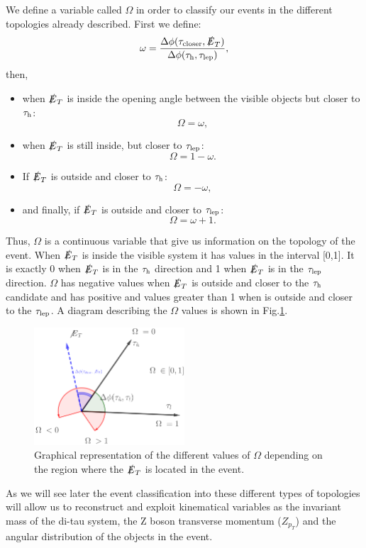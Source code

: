 We define a variable called $\Omega$ in order to classify our events in the different topologies already described. First we define:
\begin{equation}
	\omega=\frac{\Delta\phi(\tau_{\text{closer}},\slashed{E}_T)}{\Delta\phi(\tau_\text{h},\tau_\text{lep})},
\end{equation}
then,
\begin{itemize}
	\item when $\slashed{E}_T$ is inside the opening angle between the visible objects but closer to $\tau_\text{h}$:
	\begin{equation}
		\Omega=\omega,
	\end{equation}
	\item when $\slashed{E}_T$ is still inside, but closer to $\tau_\text{lep}$:
	\begin{equation}
		\Omega=1-\omega.
	\end{equation}
	\item If $\slashed{E}_T$ is outside and closer to $\tau_\text{h}$:
	\begin{equation}
		\Omega=-\omega,
	\end{equation}
	\item and finally, if $\slashed{E}_T$ is outside and closer to $\tau_\text{lep}$:
	\begin{equation}
		\Omega=\omega+1.
	\end{equation}
\end{itemize}
Thus, $\Omega$ is a continuous variable that give us information on the topology of the event. When $\slashed{E}_T$ is inside the visible system it has values in the interval [0,1]. It is exactly 0 when $\slashed{E}_T$ is in the $\tau_\text{h}$ direction and 1 when $\slashed{E}_T$ is in the $\tau_\text{lep}$ direction. $\Omega$ has negative values when $\slashed{E}_T$ is outside and closer to the $\tau_\text{h}$ candidate and has positive and values greater than 1 when is outside and closer to the $\tau_\text{lep}$. A diagram describing the $\Omega$ values is shown in Fig.\ref{Fig8}.
\begin{figure}[H]
	\centering
	\includegraphics[width=0.5\textwidth]{figures/Fig8}
	\caption{Graphical representation of the different values of $\Omega$ depending on the region where the $\slashed{E}_T$ is located in the event.}
	\label{Fig8}
\end{figure}
As we will see later the event classification into these different types of topologies will allow us to reconstruct and exploit kinematical variables as the invariant mass of the di-tau system, the Z boson transverse momentum ($Z_{p_T}$) and the angular distribution of the objects in the event.
